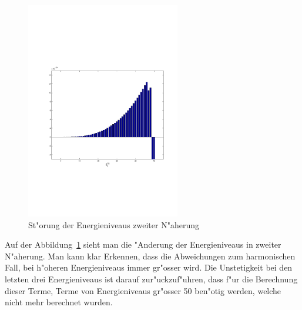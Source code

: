 \begin{refsection}
\begin{figure}[h]	%
\centering
\includegraphics[width=0.6\textwidth]{anharmonisch/images/x4/EK2.pdf}
\caption{St"orung der Energieniveaus zweiter N"aherung
\label{skript:x4_EK2}}
\end{figure}

Auf der Abbildung~\ref{skript:x4_EK2} sieht man die "Anderung der Energieniveaus in zweiter N"aherung. Man kann klar Erkennen, dass die Abweichungen zum harmonischen Fall, bei h"oheren Energieniveaus immer gr"osser wird. Die Unstetigkeit bei den letzten drei Energieniveaus ist darauf zur"uckzuf"uhren, dass f"ur die Berechnung dieser Terme, Terme von Energieniveaus gr"osser 50 ben"otig werden, welche nicht mehr berechnet wurden.


\end{refsection}
